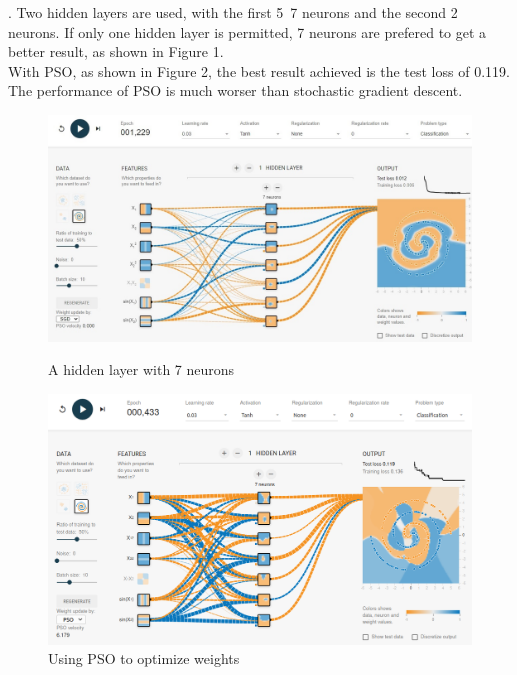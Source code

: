 \documentclass[12pt]{article}
\begin{document}
. Two hidden layers are used, with the first 5~7 neurons and the second 2 neurons. If only one hidden layer is permitted, 7 neurons are prefered to get a better result, as shown in Figure 1.\\
With PSO, as shown in Figure 2, the best result achieved is the test loss of 0.119. The performance of PSO is much worser than stochastic gradient descent.
\begin{figure}[!ht]
\centering
\begin{minipage}[t]{0.48\textwidth}
    \centering
    \includegraphics[width=\textwidth]{1.jpg}
    \caption{A hidden layer with 7 neurons}
    \label{sga_7n}
\end{minipage}
\begin{minipage}[t]{0.48\textwidth}
    \centering
    \includegraphics[width=\textwidth]{PSO.png}
    \caption{Using PSO to optimize weights}
    \label{pso_7n}
\end{minipage}
\end{figure}
\end{document}
